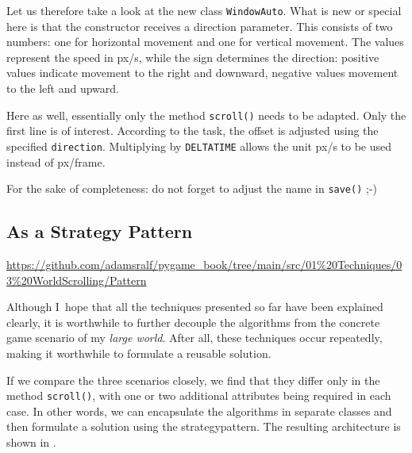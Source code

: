Let us therefore take a look at the new class \texttt{WindowAuto}. What is new or special here is that the constructor receives a direction parameter. This consists of two numbers: one for horizontal movement and one for vertical movement. The values represent the speed in \unit{px/s}, while the sign determines the direction: positive values indicate movement to the right and downward, negative values movement to the left and upward.


Here as well, essentially only the method \texttt{scroll()} needs to be adapted. Only the first line is of interest. According to the task, the offset is adjusted using the specified \texttt{direction}. Multiplying by \texttt{DELTATIME} allows the unit \unit{px/s} to be used instead of \unit{px/frame}.


For the sake of completeness: do not forget to adjust the name in \texttt{save()} ;-)


\subsection{As a Strategy Pattern}
\begin{diskbox}
	\url{https://github.com/adamsralf/pygame_book/tree/main/src/01%20Techniques/03%20WorldScrolling/Pattern}
\end{diskbox}

Although I~hope that all the techniques presented so far have been explained clearly, it is worthwhile to further decouple the algorithms from the concrete game scenario of my \emph{large world}. After all, these techniques occur repeatedly, making it worthwhile to formulate a reusable solution.

If we compare the three scenarios closely, we find that they differ only in the method \texttt{scroll()}, with one or two additional attributes being required in each case. In other words, we can encapsulate the algorithms in separate classes and then formulate a solution using the \gls{strategypattern}. The resulting architecture is shown in .

